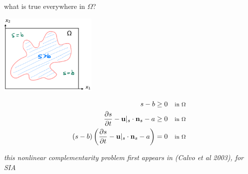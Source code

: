 \documentclass[10pt,dvipsnames]{beamer}
\newcommand{\bn}{\mathbf{n}}
\newcommand{\bu}{\mathbf{u}}
\begin{document}
\begin{frame}{what is true \alert{everywhere} in $\Omega$?}

\hfill \includegraphics[width=0.35\textwidth]{mapplane}

\begin{align*}
s - b &\ge 0 & &\where{in $\Omega$} \\
\frac{\partial s}{\partial t} - \bu|_s \cdot \bn_s - a &\ge 0 & &\where{in $\Omega$} \\
(s - b) \left(\frac{\partial s}{\partial t} - \bu|_s \cdot \bn_s - a\right) &= 0 & &\where{in $\Omega$}
\end{align*}

\vspace{10mm}
{\footnotesize \emph{this nonlinear complementarity problem first appears in (Calvo et al 2003), \emph{for SIA}}}
\end{frame}
\end{document}
